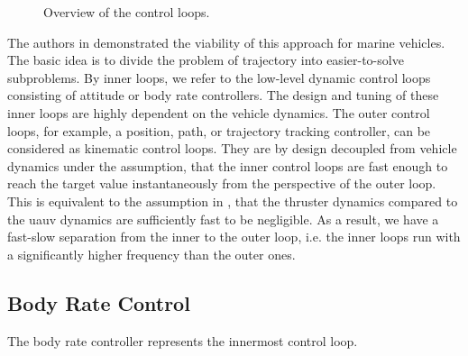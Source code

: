 \begin{figure}
	\caption{Overview of the control loops.}
	\label{fig:inner-outer-loop-feedback-control}
\end{figure}
The authors in \cite{Maurya09} demonstrated the viability of this approach for marine vehicles. The basic idea is to divide the problem of trajectory into easier-to-solve subproblems. By inner loops, we refer to the low-level dynamic control loops consisting of attitude or body rate controllers. The design and tuning of these inner loops are highly dependent on the vehicle dynamics. The outer control loops, for example, a position, path, or trajectory tracking controller, can be considered as kinematic control loops. They are by design decoupled from vehicle dynamics under the assumption, that the inner control loops are fast enough to reach the target value instantaneously from the perspective of the outer loop. This is equivalent to the assumption in , that the thruster dynamics compared to the \ac{uauv} dynamics are sufficiently fast to be negligible. As a result, we have a fast-slow separation from the inner to the outer loop, i.e. the inner loops run with a significantly higher frequency than the outer ones.







\subsection{Body Rate Control}
The body rate controller represents the innermost control loop.

